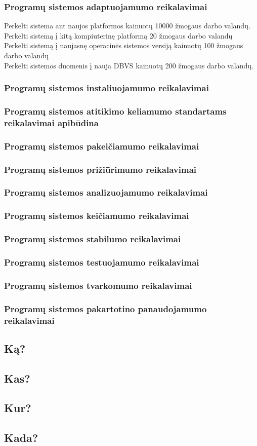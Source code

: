 \documentclass{VUMIFPSkursinis}
\begin{document}
	\subsubsection{Programų sistemos adaptuojamumo reikalavimai}
		Perkelti sistema ant naujos platformos kainuotų 10000 žmogaus darbo valandų.
		\\
		Perkelti sistemą į kitą kompiuterinę platformą 20 žmogaus darbo valandų
		\\ 
		Perkelti sistemą į naujasnę operacinės sistemos versiją kainuotų 100 žmogaus darbo valandų
		\\
		Perkelti sistemos duomenis į nauja DBVS kainuotų 200 žmogaus darbo valandų.
	\subsubsection{Programų sistemos instaliuojamumo reikalavimai}
	\subsubsection{Programų sistemos atitikimo keliamumo standartams reikalavimai apibūdina}
	\subsubsection{Programų sistemos pakeičiamumo reikalavimai}
	\subsubsection{Programų sistemos prižiūrimumo reikalavimai}
	\subsubsection{Programų sistemos analizuojamumo reikalavimai}
	\subsubsection{Programų sistemos keičiamumo reikalavimai}
	\subsubsection{Programų sistemos stabilumo reikalavimai}
	\subsubsection{Programų sistemos testuojamumo reikalavimai}
	\subsubsection{Programų sistemos tvarkomumo reikalavimai}
	\subsubsection{Programų sistemos pakartotino panaudojamumo reikalavimai}


\subsection{Ką?}
\subsection{Kas?}
\subsection{Kur?}
\subsection{Kada?}
\end{document}
